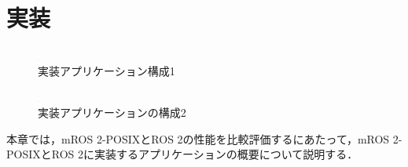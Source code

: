 \chapter{実装}
\begin{figure}[ht]
    \centering
    \includegraphics[width=1.5]{images/fig4_mros2_ros2_raspimouse_configuration.png}
    \caption{実装アプリケーション構成1}
    \label{fig:fig4_mros2_ros2_raspimouse_configuration}
\end{figure}
\begin{figure}[h]
    \centering
    \includegraphics[width=1.5]{images/fig4_pubsub_configuration.png}
    \caption{実装アプリケーションの構成2}
    \label{fig:mros2-wasm_configuration}
\end{figure}
\label{chap:implementation}

本章では，mROS 2-POSIXとROS 2の性能を比較評価するにあたって，mROS 2-POSIXとROS 2に実装するアプリケーションの概要について説明する．
